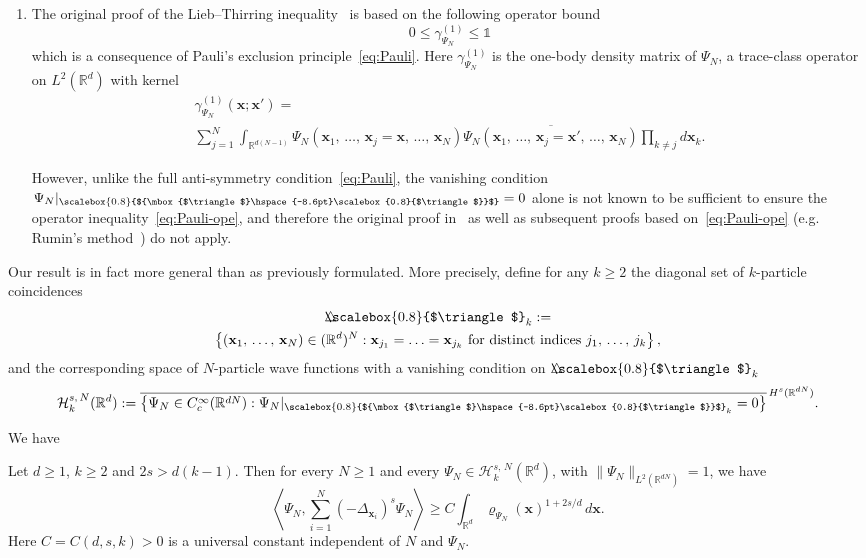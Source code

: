 \documentclass[AHL, Unicode, longabstracts, published]{cedram}
\newcommand*\R {\mathbb{R}}
\newcommand\1{{\ensuremath {\mathds 1} }}
\newcommand{\bx}{\mathbf{x}}
\newcommand{\cH}{\mathcal{H}}
\newcommand{\bDelta}{{\mbox{$\triangle$}\hspace{-8.6pt}\scalebox{0.8}{$\triangle$}}}
\newcommand{\scriptbDelta}{\scalebox{0.8}{$\bDelta$}}
\begin{document}
\begin{enumerate}
\item The original proof of the Lieb--Thirring inequality~\cite{LieThi-75,LieThi-76} is based on the following operator bound
\begin{equation}\label{eq:Pauli-ope}
0\le \gamma_{\Psi_N}^{(1)}\le \1
\end{equation}
which is a consequence of Pauli's exclusion principle~\eqref{eq:Pauli}. Here $\gamma_{\Psi_N}^{(1)}$ is the one-body density matrix of $\Psi_N$, a trace-class operator on $L^2(\R^d)$ with kernel
\begin{multline*}
\gamma_{\Psi_N}^{(1)}(\bx;\bx')=\\
\sum_{j=1}^N \int_{\R^{d(N-1)}} \Psi_N(\bx_1,\,\ldots,\,\bx_j=\bx,\,\ldots,\,\bx_N) \overline{\Psi_N(\bx_1,\,\ldots,\,\bx_j=\bx',\,\ldots,\,\bx_N)} \prod_{k\neq j} d\bx_k.
\end{multline*}

However, unlike the full anti-symmetry condition~\eqref{eq:Pauli}, the vanishing condition $\Psi_N\rvert_{\scriptbDelta}=0$ alone is not known to be sufficient to ensure the operator inequality~\eqref{eq:Pauli-ope}, and therefore the original proof in~\cite{LieThi-75,LieThi-76} as well as subsequent proofs based on~\eqref{eq:Pauli-ope} (e.g. Rumin's method~\cite{Rumin-11}) do not apply.
\end{enumerate}

Our result is in fact more general than as previously formulated. More precisely, define for any $k \ge 2$ the diagonal set of $k$-particle coincidences
\begin{multline}\label{eq:k-diagonal}
\bDelta_k :=\\
\left\{(\bx_1,\,\ldots,\,\bx_N) \in (\R^d)^{N}: \bx_{j_1}= \ldots = \bx_{j_k} \text{ for distinct indices } j_1,\,\ldots,\,j_k \right\},
\end{multline}
and the corresponding space of $N$-particle wave functions with a vanishing condition on $\bDelta_k$
\[
\cH^{s,\,N}_k(\R^d) := \overline{\left\{\Psi_N \in C_c^\infty(\R^{dN}): \Psi_N\rvert_{\scriptbDelta_k}=0 \right\}}^{\, H^s(\R^{dN})}.
\]

\goodbreak
We have
\begin{theo} \label{thm:main-general}
Let $d\ge 1$, $k \ge 2$ and $2s>d(k-1)$. Then for every $N \ge 1$ and every $\Psi_N \in\cH^{s,\,N}_k(\R^d)$, with $\|\Psi_N\|_{L^2(\R^{dN})}=1$, we have
\begin{equation}\label{eq:LT-diagonal-general}
\left\langle \Psi_N, \sum_{i=1}^N (-\Delta_{\bx_i})^s\Psi_N \right\rangle
\ge C\int_{\R^d} \varrho_{\Psi_N}(\bx)^{1+2s/d} \,d\bx.
\end{equation}
Here $C=C(d,s,k)>0$ is a universal constant independent of $N$ and $\Psi_N$.
\end{theo}
\end{document}
